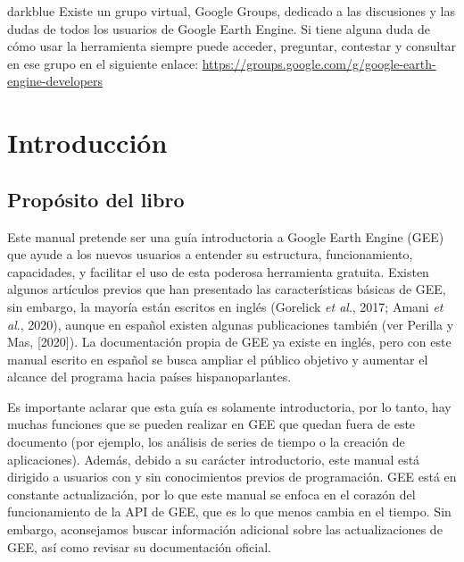 \documentclass[
  12pt,
  letterpaper,
  twoside]{book}
\renewcommand\headrulewidth{0pt}
\begin{document}
\begin{bluebox2}

\begin{awesomeblock}{5pt}{\faLightbulb}{darkblue}
Existe un grupo virtual, Google Groups, dedicado a las discusiones y las dudas de todos los usuarios de Google Earth Engine. Si tiene alguna duda de cómo usar la herramienta siempre puede acceder, preguntar, contestar y consultar en ese grupo en el siguiente enlace: \url{https://groups.google.com/g/google-earth-engine-developers}

\end{awesomeblock}

\end{bluebox2}

\newpage
\mainmatter

\renewcommand\headrulewidth{1pt}
\pagestyle{fancy} 
 \fancyfoot{}
 \fancyfoot[LE,RO]{\thepage}
 \fancyhead{}
 \fancyhead[LE,RO]{\leftmark}
 \fancyhead[LO,RE]{\rightmark}

\hypertarget{introducciuxf3n}{%
\chapter{Introducción}\label{introducciuxf3n}}

\hypertarget{propuxf3sito-del-libro}{%
\section{Propósito del libro}\label{propuxf3sito-del-libro}}

Este manual pretende ser una guía introductoria a Google Earth Engine (GEE) que ayude a los nuevos usuarios a entender su estructura, funcionamiento, capacidades, y facilitar el uso de esta poderosa herramienta gratuita. Existen algunos artículos previos que han presentado las características básicas de GEE, sin embargo, la mayoría están escritos en inglés (Gorelick \emph{et al}., 2017; Amani \emph{et al}., 2020), aunque en español existen algunas publicaciones también (ver Perilla y Mas, {[}2020{]}). La documentación propia de GEE ya existe en inglés, pero con este manual escrito en español se busca ampliar el público objetivo y aumentar el alcance del programa hacia países hispanoparlantes.

Es importante aclarar que esta guía es solamente introductoria, por lo tanto, hay muchas funciones que se pueden realizar en GEE que quedan fuera de este documento (por ejemplo, los análisis de series de tiempo o la creación de aplicaciones). Además, debido a su carácter introductorio, este manual está dirigido a usuarios con y sin conocimientos previos de programación. GEE está en constante actualización, por lo que este manual se enfoca en el corazón del funcionamiento de la API de GEE, que es lo que menos cambia en el tiempo. Sin embargo, aconsejamos buscar información adicional sobre las actualizaciones de GEE, así como revisar su documentación oficial.
\end{document}
